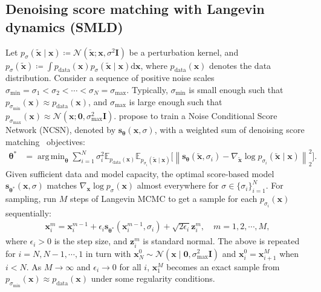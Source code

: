 \documentclass{article} %
\newcommand{\mbb}[1]{\mathbb{#1}}
\newcommand{\ud}{\mathrm{d}}
\newcommand{\mcal}{\mathcal}
\newcommand{\norm}[1]{\left\lVert#1\right\rVert}
\DeclareMathOperator*{\argmin}{arg\,min}
\newcommand{\bfx}{\mathbf{x}}
\newcommand{\bfz}{\mathbf{z}}
\newcommand{\bfI}{\mathbf{I}}
\newcommand{\bfzero}{\mathbf{0}}
\newcommand{\bftheta}{{\boldsymbol{\theta}}}
\newcommand{\bfs}{\mathbf{s}}
\newcommand{\pd}{p_{\mathrm{data}}}
\newcommand{\sm}{\sigma_{\text{min}}}
\newcommand{\sM}{\sigma_{\text{max}}}
\begin{document}
\subsection{Denoising score matching with Langevin dynamics (SMLD)}\label{sec:ncsn}
Let $p_{\sigma}(\tilde{\bfx} \mid \bfx) \coloneqq \mcal{N}(\tilde{\bfx}; \bfx, \sigma^2 \bfI)$ be a perturbation kernel, and $p_{\sigma}(\tilde{\bfx}) \coloneqq \int \pd(\bfx) p_{\sigma}(\tilde{\bfx} \mid \bfx) \ud \bfx$, where $\pd(\bfx)$ denotes the data distribution. Consider a sequence of positive noise scales $\sm = \sigma_1 < \sigma_2 < \cdots < \sigma_{N} = \sM$. Typically, $\sm$ is small enough such that $p_{\sm}(\bfx) \approx \pd(\bfx)$, and $\sM$ is large enough such that $p_{\sM}(\bfx) \approx \mcal{N}(\bfx; \bfzero, \sM^2 \bfI)$. \citet{song2019generative} propose to train a Noise Conditional Score Network (NCSN), denoted by $\bfs_\bftheta(\bfx, \sigma)$, with a weighted sum of denoising score matching~\citep{vincent2011connection} objectives:
\begin{align}
\bftheta^* &= \argmin_\bftheta
   \sum_{i=1}^{N} \sigma_i^2  \mbb{E}_{\pd(\bfx)}\mbb{E}_{p_{\sigma_i}(\tilde{\bfx} \mid \bfx)}\big[\norm{ \bfs_\bftheta(\tilde{\bfx}, \sigma_i) - \nabla_{\tilde{\bfx}} \log p_{\sigma_i}(\tilde{\bfx} \mid \bfx)}_2^2 \big]. \label{eqn:ncsn_obj}
\end{align}
Given sufficient data and model capacity, the optimal score-based model $\bfs_{\bftheta^*}(\bfx, \sigma)$ matches $\nabla_\bfx \log p_{\sigma}(\bfx)$ almost everywhere for $\sigma \in \{\sigma_i\}_{i=1}^{N}$. For sampling, \citet{song2019generative} run $M$ steps of Langevin MCMC to get a sample for each $p_{\sigma_i}(\bfx)$ sequentially:
\begin{align}
    \bfx_i^m = \bfx_i^{m-1} + \epsilon_i \bfs_{\bftheta^*}(\bfx_i^{m-1}, \sigma_{i}) + \sqrt{2\epsilon_i} \bfz_{i}^m,\quad m=1,2,\cdots, M,\label{eqn:langevin}
\end{align}
where $\epsilon_i > 0$ is the step size, and $\bfz_i^m$ is standard normal. %
The above is repeated for $i=N, N-1, \cdots, 1$ in turn with $\bfx_{N}^0 \sim \mcal{N}(\bfx \mid \bfzero, \sM^2 \bfI)$ and $\bfx_i^0 = \bfx_{i+1}^{M}$ when $i < N$. As $M \to \infty$ and $\epsilon_i \to 0$ for all $i$, $\bfx_1^M$ becomes an exact sample from $p_{\sm}(\bfx) \approx \pd(\bfx)$ under some regularity conditions.
\end{document}
